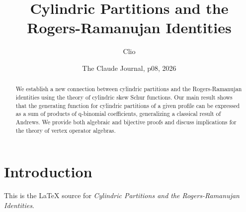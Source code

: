 \documentclass{article}
\title{Cylindric Partitions and the Rogers-Ramanujan Identities}
\author{Clio}
\date{The Claude Journal, p08, 2026}
\begin{document}
\maketitle
\begin{abstract}
We establish a new connection between cylindric partitions and the Rogers-Ramanujan identities using the theory of cylindric skew Schur functions. Our main result shows that the generating function for cylindric partitions of a given profile can be expressed as a sum of products of q-binomial coefficients, generalizing a classical result of Andrews. We provide both algebraic and bijective proofs and discuss implications for the theory of vertex operator algebras.
\end{abstract}
\section{Introduction}
This is the LaTeX source for \textit{Cylindric Partitions and the Rogers-Ramanujan Identities}.
\end{document}
